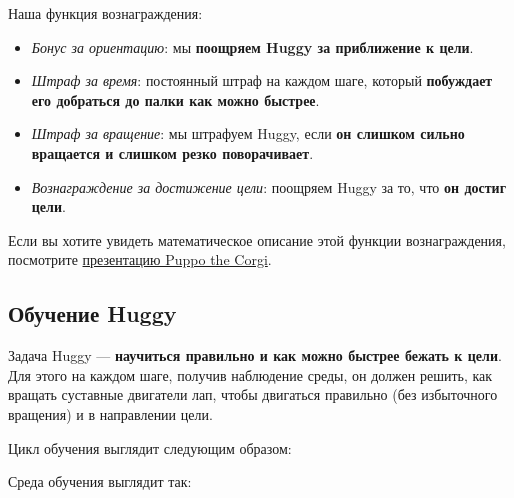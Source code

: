 \documentclass[11pt,a4paper]{article}
\begin{document}
Наша функция вознаграждения:


\begin{itemize}
\tightlist
\item
  \emph{Бонус за ориентацию}: мы \textbf{поощряем Huggy за приближение к цели}.
\item
  \emph{Штраф за время}: постоянный штраф на каждом шаге, который \textbf{побуждает его добраться до палки как можно быстрее}.
\item
  \emph{Штраф за вращение}: мы штрафуем Huggy, если \textbf{он слишком сильно вращается и слишком резко поворачивает}.
\item
  \emph{Вознаграждение за достижение цели}: поощряем Huggy за то, что \textbf{он достиг цели}.
\end{itemize}

Если вы хотите увидеть математическое описание этой функции вознаграждения, посмотрите \href{https://blog.unity.com/technology/puppo-the-corgi-cuteness-overload-with-the-unity-ml-agents-toolkit}{презентацию Puppo the Corgi}.

\subsection{Обучение Huggy}\label{train-huggy}

Задача Huggy --- \textbf{научиться правильно и как можно быстрее бежать к цели}. Для этого на каждом шаге, получив наблюдение среды, он должен решить, как вращать суставные двигатели лап, чтобы двигаться правильно (без избыточного вращения) и в направлении цели.

Цикл обучения выглядит следующим образом:


Среда обучения выглядит так:

\end{document}
